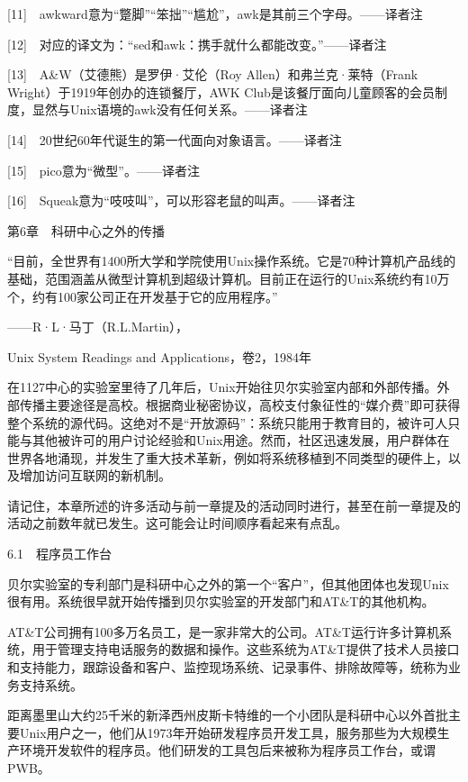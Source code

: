 \documentclass[a4paper,12pt,UTF8,twoside]{ctexbook}
\begin{document}
{{[11]　awkward意为“蹩脚”“笨拙”“尴尬”，awk是其前三个字母。——译者注

[12]　对应的译文为：“sed和awk：携手就什么都能改变。”——译者注

[13]　A\&W（艾德熊）是罗伊·艾伦（Roy Allen）和弗兰克·莱特（Frank Wright）于1919年创办的连锁餐厅，AWK Club是该餐厅面向儿童顾客的会员制度，显然与Unix语境的awk没有任何关系。——译者注

[14]　20世纪60年代诞生的第一代面向对象语言。——译者注

[15]　pico意为“微型”。——译者注

[16]　Squeak意为“吱吱叫”，可以形容老鼠的叫声。——译者注





第6章　科研中心之外的传播


“目前，全世界有1400所大学和学院使用Unix操作系统。它是70种计算机产品线的基础，范围涵盖从微型计算机到超级计算机。目前正在运行的Unix系统约有10万个，约有100家公司正在开发基于它的应用程序。”

——R·L·马丁（R.L.Martin），

Unix System Readings and Applications，卷2，1984年

在1127中心的实验室里待了几年后，Unix开始往贝尔实验室内部和外部传播。外部传播主要途径是高校。根据商业秘密协议，高校支付象征性的“媒介费”即可获得整个系统的源代码。这绝对不是“开放源码”：系统只能用于教育目的，被许可人只能与其他被许可的用户讨论经验和Unix用途。然而，社区迅速发展，用户群体在世界各地涌现，并发生了重大技术革新，例如将系统移植到不同类型的硬件上，以及增加访问互联网的新机制。

请记住，本章所述的许多活动与前一章提及的活动同时进行，甚至在前一章提及的活动之前数年就已发生。这可能会让时间顺序看起来有点乱。





6.1　程序员工作台


贝尔实验室的专利部门是科研中心之外的第一个“客户”，但其他团体也发现Unix很有用。系统很早就开始传播到贝尔实验室的开发部门和AT\&T的其他机构。

AT\&T公司拥有100多万名员工，是一家非常大的公司。AT\&T运行许多计算机系统，用于管理支持电话服务的数据和操作。这些系统为AT\&T提供了技术人员接口和支持能力，跟踪设备和客户、监控现场系统、记录事件、排除故障等，统称为业务支持系统。

距离墨里山大约25千米的新泽西州皮斯卡特维的一个小团队是科研中心以外首批主要Unix用户之一，他们从1973年开始研发程序员开发工具，服务那些为大规模生产环境开发软件的程序员。他们研发的工具包后来被称为程序员工作台，或谓PWB。

}}
\end{document}
